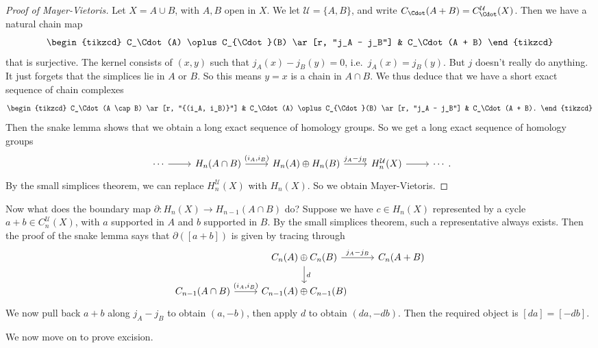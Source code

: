 \documentclass[a4paper]{article}
\theoremstyle{definition}
\begin{document}
\begin{proof}[Proof of Mayer-Vietoris]
  Let $X = A \cup B$, with $A, B$ open in $X$. We let $\mathcal{U} = \{A, B\}$, and write $C_\Cdot(A + B) = C_\Cdot^\mathcal{U} (X)$. Then we have a natural chain map
  \[
    \begin{tikzcd}
      C_\Cdot(A) \oplus C_{\Cdot}(B) \ar[r, "j_A - j_B"] & C_\Cdot(A + B)
    \end{tikzcd}
  \]
  that is surjective. The kernel consists of $(x, y)$ such that $j_A(x) - j_B(y) = 0$, i.e.\ $j_A(x) = j_B(y)$. But $j$ doesn't really do anything. It just forgets that the simplices lie in $A$ or $B$. So this means $y = x$ is a chain in $A \cap B$. We thus deduce that we have a short exact sequence of chain complexes
  \[
    \begin{tikzcd}
      C_\Cdot(A \cap B) \ar[r, "{(i_A, i_B)}"] & C_\Cdot(A) \oplus C_{\Cdot}(B) \ar[r, "j_A - j_B"] & C_\Cdot(A + B).
    \end{tikzcd}
  \]
  Then the snake lemma shows that we obtain a long exact sequence of homology groups. So we get a long exact sequence of homology groups
  \[
    \begin{tikzcd}
      \cdots\ar[r] & H_n(A \cap B) \ar[r, "{(i_A, i_B)}"] & H_n(A) \oplus H_n(B) \ar[r, "j_A - j_B"] & H_n^\mathcal{U}(X) \ar[r] & \cdots
    \end{tikzcd}.
  \]
  By the small simplices theorem, we can replace $H_n^\mathcal{U}(X)$ with $H_n(X)$. So we obtain Mayer-Vietoris.
\end{proof}

Now what does the boundary map $\partial: H_n(X) \to H_{n - 1}(A \cap B)$ do? Suppose we have $c \in H_n(X)$ represented by a cycle $a + b \in C_n^\mathcal{U}(X)$, with $a$ supported in $A$ and $b$ supported in $B$. By the small simplices theorem, such a representative always exists. Then the proof of the snake lemma says that $\partial([a + b])$ is given by tracing through
\[
  \begin{tikzcd}
    & C_n(A) \oplus C_n(B) \ar[r, "j_A - j_B"] \ar[d, "d"] & C_n(A + B)\\
    C_{n - 1}(A \cap B) \ar[r, "{(i_A, i_B)}"] & C_{n - 1}(A) \oplus C_{n - 1}(B)
  \end{tikzcd}
\]
We now pull back $a + b$ along $j_A - j_B$ to obtain $(a, -b)$, then apply $d$ to obtain $(da, -db)$. Then the required object is $[da] = [-db]$.

We now move on to prove excision.
\end{document}

